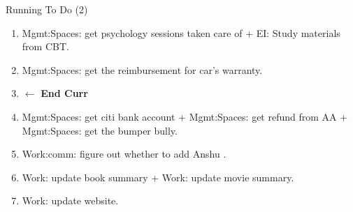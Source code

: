 \begin{frame}{Running To Do (2)} 
  \begin{enumerate}
    \conti
\item Mgmt:Spaces: get psychology sessions taken care of +  EI: Study materials from CBT.   
\item Mgmt:Spaces: get the reimbursement for car's warranty. 
\item $\leftarrow$ \textbf{End Curr}
\item  Mgmt:Spaces: get citi bank account + Mgmt:Spaces: get refund from AA  + Mgmt:Spaces: get the bumper bully. 
  
\item Work:comm: figure out whether to add Anshu .
\item  Work: update book summary + Work: update movie summary. 
\item  Work: update website. 
  \end{enumerate}
\end{frame}
